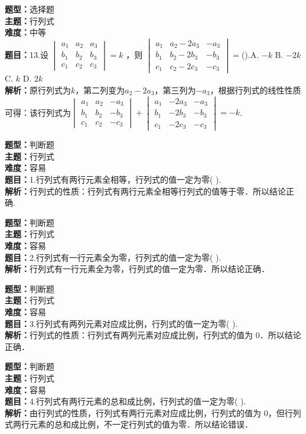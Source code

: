 \documentclass{ctexart}
\newenvironment{question}[5]{%
	\noindent\textbf{题型：}#1\\
	\textbf{主题：}#2\\
	\textbf{难度：}#3\\
	\textbf{题目：}#4\\
	\textbf{解析：}#5\\
	\vspace{1em}
}{}
\begin{document}
	\begin{question}
		{选择题}
		{行列式}
		{中等}
		{13.设 \(\begin{vmatrix}a_1 & a_2 & a_3 \\ b_1 & b_2 & b_3 \\ c_1 & c_2 & c_3\end{vmatrix}=k\) ，则 \(\begin{vmatrix}a_1 & a_2-2a_3 & -a_3 \\ b_1 & b_2-2b_3 & -b_3 \\ c_1 & c_2-2c_3 & -c_3\end{vmatrix}=\)().A. \(-k\) B. \(-2k\) C. \(k\) D. \(2k\)}
		{原行列式为\(k\)，第二列变为\(a_2 - 2a_3\)，第三列为\(-a_3\)，根据行列式的线性性质可得：该行列式为\(\begin{vmatrix}a_1 & a_2 & -a_3 \\ b_1 & b_2 & -b_3 \\ c_1 & c_2 & -c_3\end{vmatrix} + \begin{vmatrix}a_1 & -2a_3 & -a_3 \\ b_1 & -2b_3 & -b_3 \\ c_1 & -2c_3 & -c_3\end{vmatrix} = -k\). }
	\end{question}
	
	\begin{question}
		{判断题}
		{行列式}
		{容易}
		{1.行列式有两行元素全相等，行列式的值一定为零(  ).}
		{行列式的性质：行列式有两行元素全相等行列式的值等于零．所以结论正确.}
	\end{question}
	
	
	\begin{question}
		{判断题}
		{行列式}
		{容易}
		{2.行列式有一行元素全为零，行列式的值一定为零(  ).}
		{行列式有一行元素全为零，行列式的值一定为零．所以结论正确．}
	\end{question}
	
	\begin{question}
		{判断题}
		{行列式}
		{容易}
		{3.行列式有两列元素对应成比例，行列式的值一定为零(  ).}
		{行列式的性质：行列式有两列元素对应成比例，行列式的值为 0．所以结论正确．}
	\end{question}
	
	\begin{question}
		{判断题}
		{行列式}
		{容易}
		{4.行列式有两行元素的总和成比例，行列式的值一定为零(  ).}
		{由行列式的性质，行列式有两行元素对应成比例，行列式的值为 0，但行列式两行元素的总和成比例，不一定行列式的值为零．所以结论错误．}
	\end{question}
	
\end{document}
